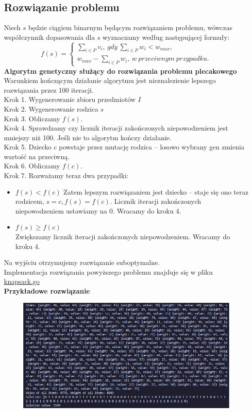 \documentclass{article}
\begin{document}
    \subsection{Rozwiązanie problemu}
    Niech $s$ będzie ciągiem binarnym będącym rozwiązaniem problemu, wówczas współczynnik dopasowania dla $s$ wyznaczamy według następującej formuły: $$f(s) = \left\{\begin{array}{l}
    \sum_{i\in P}v_i,\ gdy\ \sum_{i\in P}w_i < w_{max}, \\
    w_{max} - \sum_{i\in P}w_i,\ w\ przeciwnym\ przypadku.
    \end{array}\right.$$
    \textbf{Algorytm genetyczny służący do rozwiązania problemu plecakowego}\\
    Warunkiem kończącym działanie algorytmu jest nieznalezienie lepszego rozwiązania przez 100 iteracji.\\
    Krok 1. Wygenerowanie zbioru przedmiotów $I$\\
    Krok 2. Wygenerowanie rodzica $s$\\
    Krok 3. Obliczamy $f(s)$.\\
    Krok 4. Sprawdzamy czy licznik iteracji zakończonych niepowodzeniem jest mniejszy niż 100. Jeśli nie to algorytm kończy działanie.\\
    Krok 5. Dziecko $c$ powstaje przez mutację rodzica -- losowo wybrany gen zmienia wartość na przeciwną.\\
    Krok 6. Obliczamy $f(c)$.\\
    Krok 7. Rozważamy teraz dwa przypadki:
    \begin{itemize}
    \item $f(s)<f(c)$
        Zatem lepszym rozwiązaniem jest dziecko -- staje się ono teraz rodzicem, $s=c, f(s)=f(c)$. Licznik iteracji zakończonych niepowodzeniem ustawiamy na 0. Wracamy do kroku 4.
    \item $f(s)\geq f(c)$\\
        Zwiększamy licznik iteracji zakończonych niepowodzeniem. Wracamy do kroku 4.
    \end{itemize}
    Na wyjściu otrzymujemy rozwiązanie suboptymalne.\\
    Implementacja rozwiązania powyższego problemu znajduje się w pliku \href{https://github.com/Kaniek99/AIbasics/blob/main/src/knapsack/knapsack.go}{knapsack.go}\\
    \textbf{Przykładowe rozwiązanie}\\
    \begin{figure}[h]
    \includegraphics[width=\linewidth]{knapsack_example.png}
    \end{figure}
\newpage
\end{document}

